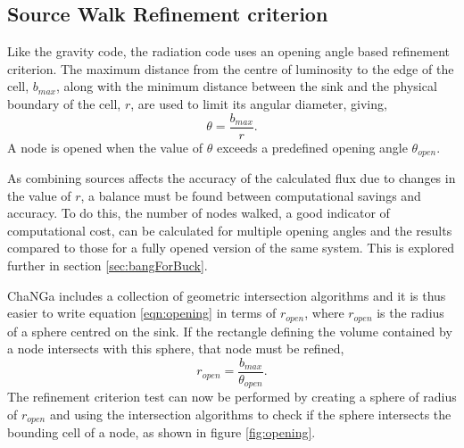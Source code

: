 \subsection{Source Walk Refinement criterion}
\label{sec:sourceRef}
Like the gravity code, the radiation code uses an opening angle based refinement criterion. The maximum distance from the centre of luminosity to the edge of the cell, $b_{max}$, along with the minimum distance between the sink and the physical boundary of the cell, $r$, are used to limit its angular diameter, giving,
\begin{equation}
    \label{eqn:openingTheta}
    \theta = \frac{b_{max}}{r}.
\end{equation}
A node is opened when the value of $\theta$ exceeds a predefined opening angle $\theta_{open}$.

As combining sources affects the accuracy of the calculated flux due to changes in the value of $r$, a balance must be found between computational savings and accuracy. To do this, the number of nodes walked, a good indicator of computational cost, can be calculated for multiple opening angles and the results compared to those for a fully opened version of the same system. This is explored further in section \ref{sec:bangForBuck}.

ChaNGa includes a collection of geometric intersection algorithms and it is thus easier to write equation \ref{eqn:opening} in terms of $r_{open}$, where $r_{open}$ is the radius of a sphere centred on the sink. If the rectangle defining the volume contained by a node intersects with this sphere, that node must be refined,
\begin{equation}
    \label{eqn:opening}
    r_{open} = \frac{b_{max}}{\theta_{open}}.
\end{equation}
The refinement criterion test can now be performed by creating a sphere of radius of $r_{open}$ and using the intersection algorithms to check if the sphere intersects the bounding cell of a node, as shown in figure \ref{fig:opening}.

